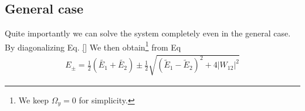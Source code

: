 \subsection{General case}

Quite importantly we can solve the system completely even in the general case. By diagonalizing  Eq. \eqref{} We then obtain\footnote{We keep $\Omega_y =0$ for simplicity.} from Eq
\begin{align}\label{eq:Epm}
 E_\pm = \frac{1}{2}\left(\tilde{E_1}+\tilde{E_2}\right) \pm \frac{1}{2} \sqrt{\left(\tilde{E}_1-\tilde{E}_2\right)^2+4 \left|W_{12}\right|^2}
\end{align}